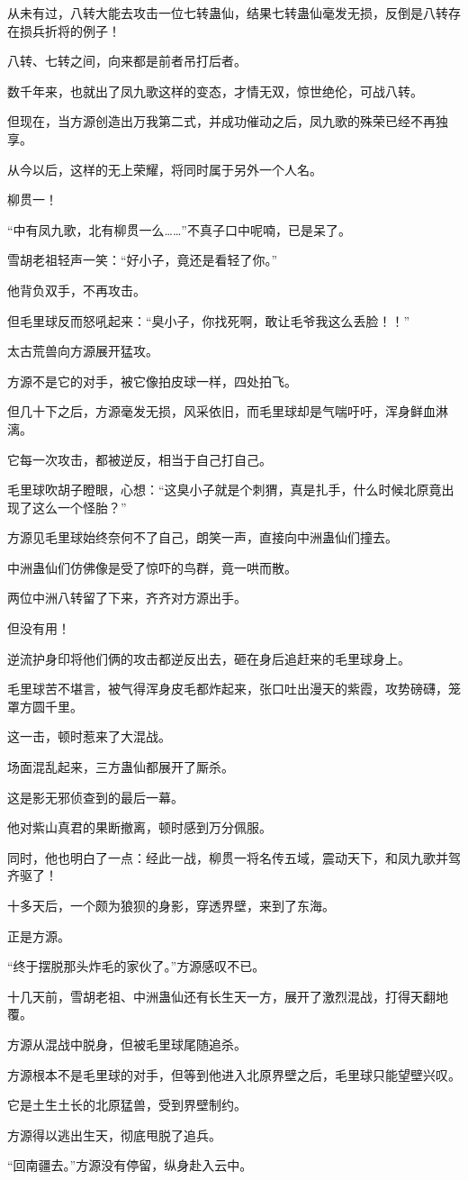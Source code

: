 \begin{this_body}
从未有过，八转大能去攻击一位七转蛊仙，结果七转蛊仙毫发无损，反倒是八转存在损兵折将的例子！

八转、七转之间，向来都是前者吊打后者。

数千年来，也就出了凤九歌这样的变态，才情无双，惊世绝伦，可战八转。

但现在，当方源创造出万我第二式，并成功催动之后，凤九歌的殊荣已经不再独享。

从今以后，这样的无上荣耀，将同时属于另外一个人名。

柳贯一！

“中有凤九歌，北有柳贯一么……”不真子口中呢喃，已是呆了。

雪胡老祖轻声一笑：“好小子，竟还是看轻了你。”

他背负双手，不再攻击。

但毛里球反而怒吼起来：“臭小子，你找死啊，敢让毛爷我这么丢脸！！”

太古荒兽向方源展开猛攻。

方源不是它的对手，被它像拍皮球一样，四处拍飞。

但几十下之后，方源毫发无损，风采依旧，而毛里球却是气喘吁吁，浑身鲜血淋漓。

它每一次攻击，都被逆反，相当于自己打自己。

毛里球吹胡子瞪眼，心想：“这臭小子就是个刺猬，真是扎手，什么时候北原竟出现了这么一个怪胎？”

方源见毛里球始终奈何不了自己，朗笑一声，直接向中洲蛊仙们撞去。

中洲蛊仙们仿佛像是受了惊吓的鸟群，竟一哄而散。

两位中洲八转留了下来，齐齐对方源出手。

但没有用！

逆流护身印将他们俩的攻击都逆反出去，砸在身后追赶来的毛里球身上。

毛里球苦不堪言，被气得浑身皮毛都炸起来，张口吐出漫天的紫霞，攻势磅礴，笼罩方圆千里。

这一击，顿时惹来了大混战。

场面混乱起来，三方蛊仙都展开了厮杀。

这是影无邪侦查到的最后一幕。

他对紫山真君的果断撤离，顿时感到万分佩服。

同时，他也明白了一点：经此一战，柳贯一将名传五域，震动天下，和凤九歌并驾齐驱了！

十多天后，一个颇为狼狈的身影，穿透界壁，来到了东海。

正是方源。

“终于摆脱那头炸毛的家伙了。”方源感叹不已。

十几天前，雪胡老祖、中洲蛊仙还有长生天一方，展开了激烈混战，打得天翻地覆。

方源从混战中脱身，但被毛里球尾随追杀。

方源根本不是毛里球的对手，但等到他进入北原界壁之后，毛里球只能望壁兴叹。

它是土生土长的北原猛兽，受到界壁制约。

方源得以逃出生天，彻底甩脱了追兵。

“回南疆去。”方源没有停留，纵身赴入云中。

\end{this_body}

